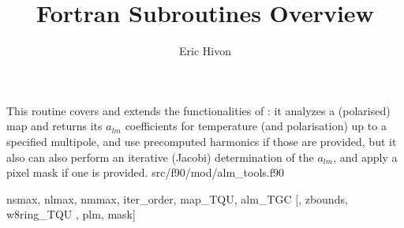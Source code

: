 
\sloppy


\title{\healpix Fortran Subroutines Overview}
 \section[map2alm\_iterative*]{ }
\label{sub:map2alm_iterative}
\author{Eric Hivon}

\begin{facility}
{This routine covers and extends the functionalities of : it
analyzes a (polarised)  map and returns
its $a_{lm}$ coefficients for temperature (and polarisation) up to a specified
multipole, and use precomputed harmonics if those
are provided, but it also can also perform an iterative (Jacobi) determination of the $a_{lm}$, and
apply a pixel mask if one is provided.}
{src/f90/mod/alm\_tools.f90}
\end{facility}

\begin{f90format}
{nsmax, nlmax, nmmax, iter\_order, map\_TQU, alm\_TGC [, zbounds, w8ring\_TQU ,
plm, mask]}
\end{f90format}

